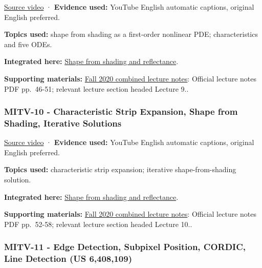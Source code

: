 \href{https://www.youtube.com/watch?v=J4gbaRyWpoM}{Source video} · \textbf{Evidence used:} YouTube English automatic captions, original English preferred.

\textbf{Topics used:} shape from shading as a first-order nonlinear PDE; characteristics and five ODEs.

\textbf{Integrated here:} \hyperref[04-visual-computing-ii-ch032-shape-from-shading-and-reflectance]{Shape from shading and reflectance}.

\textbf{Supporting materials:} \href{https://ocw.mit.edu/courses/6-801-machine-vision-fall-2020/9ec44f69e72995c370b3797818ba01e6_MIT6_801F20_lectureNotes.pdf}{Fall 2020 combined lecture notes}: Official lecture notes PDF pp.~46-51; relevant lecture section headed Lecture 9..

\subsubsection{MITV-10 - Characteristic Strip Expansion, Shape from Shading, Iterative Solutions}\label{04-visual-computing-ii-ch036-mitv-10---characteristic-strip-expansion-shape-from-shading-iterative-solutions}

\hypertarget{04-visual-computing-ii-ch036-mitv-10---characteristic-strip-expansion-shape-from-shading-iterative-solutions}{}

\href{https://www.youtube.com/watch?v=XSUjp-cDyeY}{Source video} · \textbf{Evidence used:} YouTube English automatic captions, original English preferred.

\textbf{Topics used:} characteristic strip expansion; iterative shape-from-shading solution.

\textbf{Integrated here:} \hyperref[04-visual-computing-ii-ch032-shape-from-shading-and-reflectance]{Shape from shading and reflectance}.

\textbf{Supporting materials:} \href{https://ocw.mit.edu/courses/6-801-machine-vision-fall-2020/9ec44f69e72995c370b3797818ba01e6_MIT6_801F20_lectureNotes.pdf}{Fall 2020 combined lecture notes}: Official lecture notes PDF pp.~52-58; relevant lecture section headed Lecture 10..

\subsubsection{MITV-11 - Edge Detection, Subpixel Position, CORDIC, Line Detection (US 6,408,109)}\label{04-visual-computing-ii-ch036-mitv-11---edge-detection-subpixel-position-cordic-line-detection-us-6408109}

